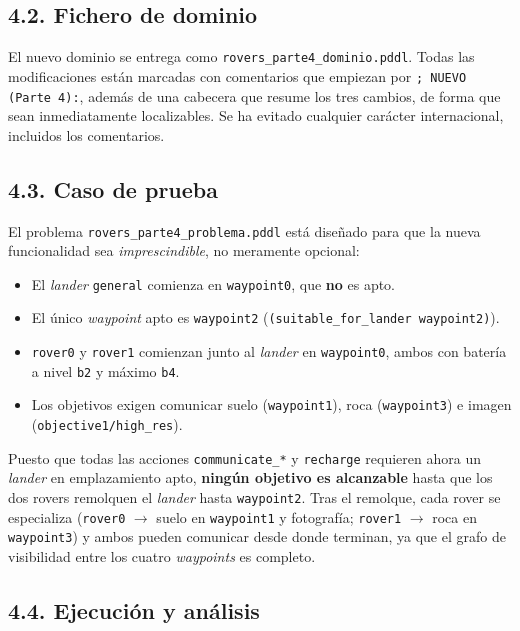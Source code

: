 \documentclass[12pt,a4paper]{article}
\begin{document}
\subsection{4.2. Fichero de dominio}

El nuevo dominio se entrega como \texttt{rovers\_parte4\_dominio.pddl}. Todas
las modificaciones est\'an marcadas con comentarios que empiezan por
\texttt{; NUEVO (Parte 4):}, adem\'as de una cabecera que resume los tres
cambios, de forma que sean inmediatamente localizables. Se ha evitado
cualquier car\'acter internacional, incluidos los comentarios.

\subsection{4.3. Caso de prueba}

El problema \texttt{rovers\_parte4\_problema.pddl} est\'a dise\~nado para que
la nueva funcionalidad sea \emph{imprescindible}, no meramente opcional:

\begin{itemize}[leftmargin=*]
\item El \emph{lander} \texttt{general} comienza en \texttt{waypoint0}, que
\textbf{no} es apto.
\item El \'unico \emph{waypoint} apto es \texttt{waypoint2}
(\texttt{(suitable\_for\_lander waypoint2)}).
\item \texttt{rover0} y \texttt{rover1} comienzan junto al \emph{lander} en
\texttt{waypoint0}, ambos con bater\'ia a nivel \texttt{b2} y m\'aximo
\texttt{b4}.
\item Los objetivos exigen comunicar suelo (\texttt{waypoint1}), roca
(\texttt{waypoint3}) e imagen (\texttt{objective1/high\_res}).
\end{itemize}

Puesto que todas las acciones \texttt{communicate\_*} y \texttt{recharge}
requieren ahora un \emph{lander} en emplazamiento apto, \textbf{ning\'un
objetivo es alcanzable} hasta que los dos rovers remolquen el \emph{lander}
hasta \texttt{waypoint2}. Tras el remolque, cada rover se especializa
(\texttt{rover0} $\rightarrow$ suelo en \texttt{waypoint1} y fotograf\'ia;
\texttt{rover1} $\rightarrow$ roca en \texttt{waypoint3}) y ambos pueden
comunicar desde donde terminan, ya que el grafo de visibilidad entre los
cuatro \emph{waypoints} es completo.

\subsection{4.4. Ejecuci\'on y an\'alisis}
\end{document}
